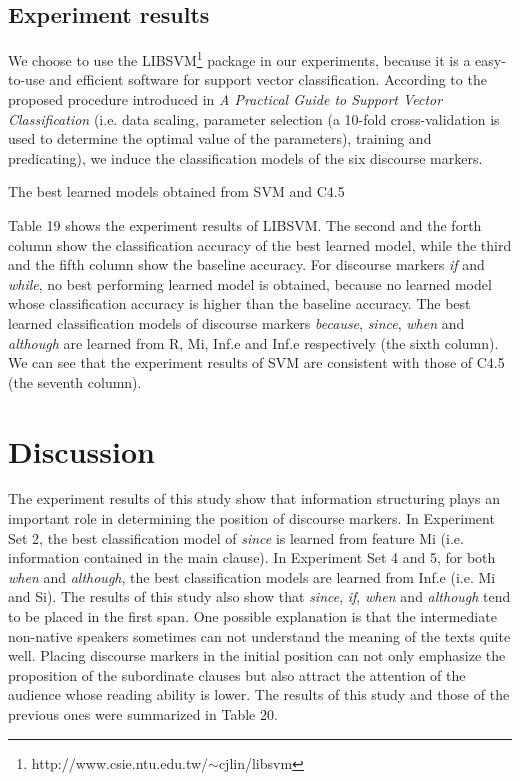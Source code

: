 \documentclass[english]{jnlp_1.3e}
\begin{document}
\subsection{Experiment results}

We choose to use the LIBSVM\footnote{http://www.csie.ntu.edu.tw/$\sim$cjlin/libsvm}
package in our experiments, because it is a easy-to-use and
efficient software for support vector classification. According to the proposed procedure
introduced in \textit{A Practical Guide to Support Vector Classification} (i.e. data scaling, parameter
selection (a 10-fold cross-validation is used to determine the optimal value of the parameters),
training and predicating), we induce the classification models of the six discourse markers. 

\begin{table}[t]
\caption{The best learned models obtained from SVM and C4.5}

\end{table}


Table 19 shows the experiment results of LIBSVM. The second and the forth column show 
the classification accuracy of the best learned model, while the third and the fifth column show
the baseline accuracy. For discourse markers \textit{if} and \textit{while}, no best performing learned model
is obtained, because no learned model whose classification accuracy is higher than the baseline
accuracy. The best learned classification models of discourse markers \textit{because}, 
\textit{since}, \textit{when} and \textit{although} are learned from R, Mi, Inf.e and Inf.e 
respectively (the sixth column). We can see
that the experiment results of SVM are consistent with those of C4.5 (the seventh column).



\section{Discussion}  

The experiment results of this study show that information 
structuring plays an important role in determining the position
of discourse markers. In Experiment Set 2, the best classification 
model of \textit{since} is learned from feature Mi 
(i.e. information contained in the main clause). 
In Experiment Set 4 and 5, for both \textit{when} and \textit{although}, 
the best classification models are learned from Inf.e (i.e. Mi and Si). 
The results of this study also show that \textit{since}, 
\textit{if}, \textit{when} and \textit{although} tend to 
be placed in the first span. One possible explanation is that the 
intermediate non-native speakers sometimes can not understand the
meaning of the texts quite well. Placing discourse markers in the 
initial position can not only emphasize the proposition of the subordinate clauses
but also attract the attention of the audience whose reading ability
is lower. The results of this study and those of the previous
ones were summarized in Table 20.
\end{document}
